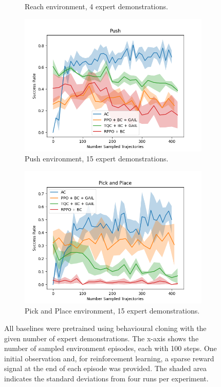 \begin{figure}[htbp]
\begin{subfigure}[t]{0.45\textwidth}
    \caption{Reach environment, 4 expert demonstrations.}
    \label{fig:plot1}
  \end{subfigure}
  \medskip
  \begin{subfigure}[t]{0.45\textwidth}
    \includegraphics[width=\textwidth]{images/FineTuning/Push.png}
    \caption{Push environment, 15 expert demonstrations.}
    \label{fig:plot2}
  \end{subfigure}
  \begin{subfigure}[t]{0.45\textwidth}
    \includegraphics[width=\textwidth]{images/FineTuning/Pick and Place.png}
    \caption{Pick and Place environment, 15 expert demonstrations.}
    \label{fig:plot4}
  \end{subfigure}
  \caption{
    All baselines were pretrained using behavioural cloning with the given number of expert demonstrations. 
    The x-axis shows the number of sampled environment episodes, each with 100 steps. 
    One initial observation and, for reinforcement learning, a sparse reward signal at the end of each episode was provided. 
    The shaded area indicates the standard deviations from four runs per experiment.}
    \label{fig:finetuning}
\end{figure}

